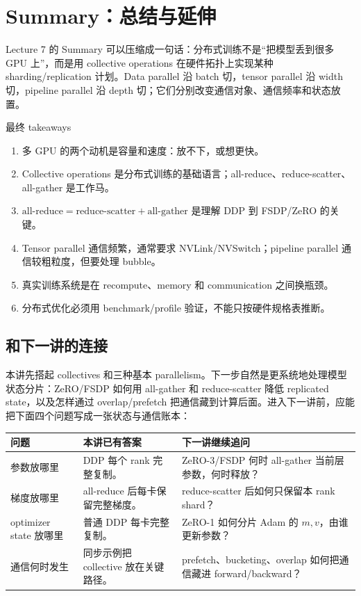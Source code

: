 \section{Summary：总结与延伸}

Lecture 7 的 Summary 可以压缩成一句话：分布式训练不是“把模型丢到很多 GPU 上”，而是用 collective operations 在硬件拓扑上实现某种 sharding/replication 计划。Data parallel 沿 batch 切，tensor parallel 沿 width 切，pipeline parallel 沿 depth 切；它们分别改变通信对象、通信频率和状态放置。

\begin{importantbox}{最终 takeaways}
\begin{enumerate}
    \item 多 GPU 的两个动机是容量和速度：放不下，或想更快。
    \item Collective operations 是分布式训练的基础语言；all-reduce、reduce-scatter、all-gather 是工作马。
    \item \(\text{all-reduce}=\text{reduce-scatter}+\text{all-gather}\) 是理解 DDP 到 FSDP/ZeRO 的关键。
    \item Tensor parallel 通信频繁，通常要求 NVLink/NVSwitch；pipeline parallel 通信较粗粒度，但要处理 bubble。
    \item 真实训练系统是在 recompute、memory 和 communication 之间换瓶颈。
    \item 分布式优化必须用 benchmark/profile 验证，不能只按硬件规格表推断。
\end{enumerate}
\end{importantbox}

\subsection{和下一讲的连接}

本讲先搭起 collectives 和三种基本 parallelism。下一步自然是更系统地处理模型状态分片：ZeRO/FSDP 如何用 all-gather 和 reduce-scatter 降低 replicated state，以及怎样通过 overlap/prefetch 把通信藏到计算后面。进入下一讲前，应能把下面四个问题写成一张状态与通信账本：

\begin{center}
\begin{tabular}{L{0.2\textwidth}L{0.28\textwidth}L{0.38\textwidth}}
\toprule
问题 & 本讲已有答案 & 下一讲继续追问 \\
\midrule
参数放哪里 & DDP 每个 rank 完整复制。 & ZeRO-3/FSDP 何时 all-gather 当前层参数，何时释放？ \\
梯度放哪里 & all-reduce 后每卡保留完整梯度。 & reduce-scatter 后如何只保留本 rank shard？ \\
optimizer state 放哪里 & 普通 DDP 每卡完整复制。 & ZeRO-1 如何分片 Adam 的 \(m,v\)，由谁更新参数？ \\
通信何时发生 & 同步示例把 collective 放在关键路径。 & prefetch、bucketing、overlap 如何把通信藏进 forward/backward？ \\
\bottomrule
\end{tabular}
\end{center}

